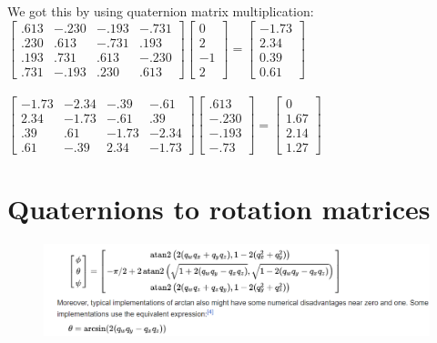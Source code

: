 \documentclass{article}
\begin{document}
We got this by using quaternion matrix multiplication:\\
$\begin{bmatrix}
.613 & -.230 & -.193 & -.731\\
.230 & .613 & -.731 & .193\\
 .193 & .731 & .613 & -.230\\
 .731 & -.193 &  .230 & .613 
\end{bmatrix}\begin{bmatrix}
0\\
2\\
-1\\
2
\end{bmatrix}=\begin{bmatrix}
-1.73\\
2.34\\
0.39\\
0.61
\end{bmatrix}$\\\\
$\begin{bmatrix}
-1.73 & -2.34 & -.39 & -.61\\
2.34 & -1.73 & -.61 & .39\\
 .39 & .61 &  -1.73 & -2.34\\
 .61 & -.39 &  2.34 & -1.73 
\end{bmatrix}\begin{bmatrix}
.613\\
-.230\\
-.193\\
-.73
\end{bmatrix}=\begin{bmatrix}
0\\
1.67\\
2.14\\
1.27
\end{bmatrix}$

\section{Quaternions to rotation matrices}
\begin{figure}[htp]
    \includegraphics[width=12cm]{quat_to_euler.png}
    \label{fig:mainy}
\end{figure} \\
\end{document}
